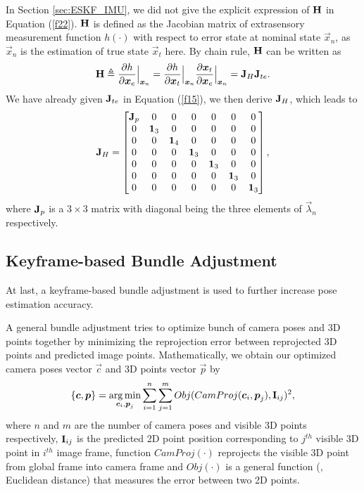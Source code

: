 In Section \ref{sec:ESKF_IMU}, we did not give the explicit expression of $\mathbf{H}$ in Equation (\ref{f22}). $\mathbf{H}$ is defined as the Jacobian matrix of extrasensory measurement function $h(\cdot)$ with respect to error state at nominal state $\vec{x}_n$, as $\vec{x}_n$ is the estimation of true state $\vec{x}_t$ here. By chain rule, $\mathbf{H}$ can be written as
\begin{equation}
	\mathbf{H} \triangleq \frac{\partial{h}}{\partial{\boldsymbol{x}_e}}\Bigr|_{\boldsymbol{x}_n} = \frac{\partial{h}}{\partial{\boldsymbol{x}_t}}\Bigr|_{\boldsymbol{x}_n}\frac{\partial{\boldsymbol{x}_t}}{\partial{\boldsymbol{x}_e}}\Bigr|_{\boldsymbol{x}_n} = \mathbf{J}_H\mathbf{J}_{t e}.
\end{equation}
We have already given $\mathbf{J}_{t e}$ in Equation (\ref{f15}), we then derive $\mathbf{J}_H$, which leads to
\begin{equation}
	\mathbf{J}_H = \begin{bmatrix}
	\mathbf{J}_p & 0 & 0 & 0 & 0 & 0 & 0\\
	0 & \mathbf{1}_3 &0 & 0 & 0 & 0 & 0\\
	0 & 0 & \mathbf{1}_4 & 0 & 0 & 0 & 0\\
	0 & 0 & 0 & \mathbf{1}_3 & 0 & 0 & 0\\
	0 & 0 & 0 & 0 & \mathbf{1}_3 & 0 & 0\\
	0 & 0 & 0 & 0 & 0 & \mathbf{1}_3 & 0\\
	0 & 0 & 0 & 0 & 0 & 0 & \mathbf{1}_3 \\
	\end{bmatrix},
\end{equation}
where $\mathbf{J}_p$ is a $3 \times 3$ matrix with diagonal being the three elements of $\vec{\lambda}_n$ respectively.

\subsection{Keyframe-based Bundle Adjustment}
\label{subsec:camera_comple_data_sub3}

At last, a keyframe-based bundle adjustment is used to further increase pose estimation accuracy.

A general bundle adjustment tries to optimize bunch of camera poses and 3D points together by minimizing the reprojection error between reprojected 3D points and predicted image points. Mathematically, we obtain our optimized camera poses vector $\vec{c}$ and 3D points vector $\vec{p}$ by
\begin{equation}\label{c1}
	\{ \boldsymbol{c}, \boldsymbol{p} \} = \mathop{\rm arg\,min}\limits_{\boldsymbol{c}_i, \boldsymbol{p}_j} \sum_{i=1}^n \sum_{j=1}^m Obj(CamProj(\boldsymbol{c}_i, \boldsymbol{p}_j), \mathbf{I}_{ij})^2,
\end{equation}
where $n$ and $m$ are the number of camera poses and visible 3D points respectively, $\mathbf{I}_{ij}$ is the predicted 2D point position corresponding to $j^{th}$ visible 3D point in $i^{th}$ image frame, function $CamProj(\cdot)$ reprojects the visible 3D point from global frame into camera frame and $Obj(\cdot)$ is a general function (\eg, Euclidean distance) that measures the error between two 2D points.

